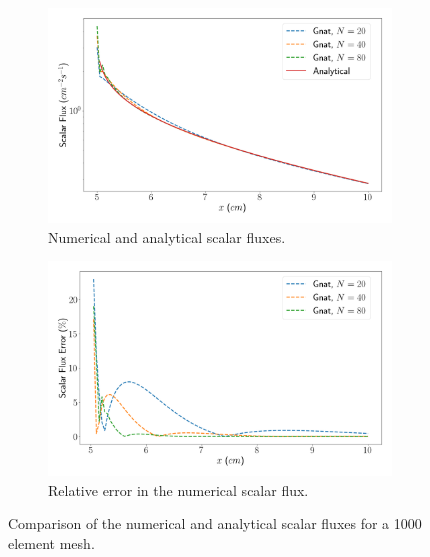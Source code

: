 \begin{figure}[H]
    \centering
    \begin{subfigure}[b]{0.495\textwidth}
        \centering
        \includegraphics[width=\textwidth]{images/verification/1d_slab/1D_analytical_flux_3.png}
        \caption{Numerical and analytical scalar fluxes.}
        \label{fig:verification:1D_flux:1000_elem}
    \end{subfigure}
    \hfill
    \begin{subfigure}[b]{0.495\textwidth}
        \centering
        \includegraphics[width=\textwidth]{images/verification/1d_slab/1D_analytical_flux_error_3.png}
        \caption{Relative error in the numerical scalar flux.}
        \label{fig:verification:1D_flux:1000_elem_error}
    \end{subfigure}
    \caption{Comparison of the numerical and analytical scalar fluxes for a 1000 element mesh.}
    \label{fig:verification:1D_flux_1000_elem}
\end{figure}

